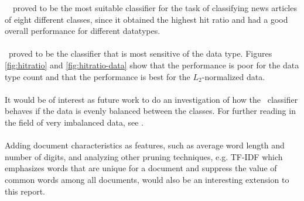 \mn\ \nb\ proved to be the most suitable classifier for the task of classifying news articles of eight different classes, since it obtained the highest hit ratio and had a good overall performance for different datatypes.
\\\\
\svm\ proved to be the classifier that is most sensitive of the data type. Figures \ref{fig:hitratio} and \ref{fig:hitratio-data} show that the performance is poor for the data type count and that the performance is best for the $L_2$-normalized data.
\\\\
It would be of interest as future work to do an investigation of how the \rf\ classifier behaves if the data is evenly balanced between the classes. For further reading in the field of very imbalanced data, see \cite{Chen}.
\\\\
Adding document characteristics as features, such as average word length and number of digits, and analyzing other pruning techniques, e.g. TF-IDF which emphasizes words that are unique for a document and suppress the value of common words among all documents, would also be an interesting extension to this report.
